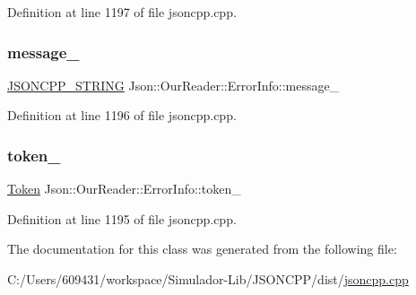 Definition at line 1197 of file jsoncpp.\+cpp.

\hypertarget{class_json_1_1_our_reader_1_1_error_info_af14b6bf58ee1cb3388c18ee336ee2394}{}\label{class_json_1_1_our_reader_1_1_error_info_af14b6bf58ee1cb3388c18ee336ee2394} 
\subsubsection{\texorpdfstring{message\+\_\+}{message\_}}
{\footnotesize\ttfamily \hyperlink{config_8h_a1e723f95759de062585bc4a8fd3fa4be}{J\+S\+O\+N\+C\+P\+P\+\_\+\+S\+T\+R\+I\+NG} Json\+::\+Our\+Reader\+::\+Error\+Info\+::message\+\_\+}



Definition at line 1196 of file jsoncpp.\+cpp.

\hypertarget{class_json_1_1_our_reader_1_1_error_info_ad05204ecabe5e7201a842935b874ae9a}{}\label{class_json_1_1_our_reader_1_1_error_info_ad05204ecabe5e7201a842935b874ae9a} 
\subsubsection{\texorpdfstring{token\+\_\+}{token\_}}
{\footnotesize\ttfamily \hyperlink{class_json_1_1_our_reader_1_1_token}{Token} Json\+::\+Our\+Reader\+::\+Error\+Info\+::token\+\_\+}



Definition at line 1195 of file jsoncpp.\+cpp.



The documentation for this class was generated from the following file\+:\begin{DoxyCompactItemize}
\item 
C\+:/\+Users/609431/workspace/\+Simulador-\/\+Lib/\+J\+S\+O\+N\+C\+P\+P/dist/\hyperlink{jsoncpp_8cpp}{jsoncpp.\+cpp}\end{DoxyCompactItemize}

